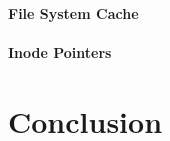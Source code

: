 \documentclass[a4paper,10pt,twocolumn]{article}
\begin{document}
%


\paragraph{File System Cache}
\paragraph{Inode Pointers}
\section{Conclusion}


\end{document}

